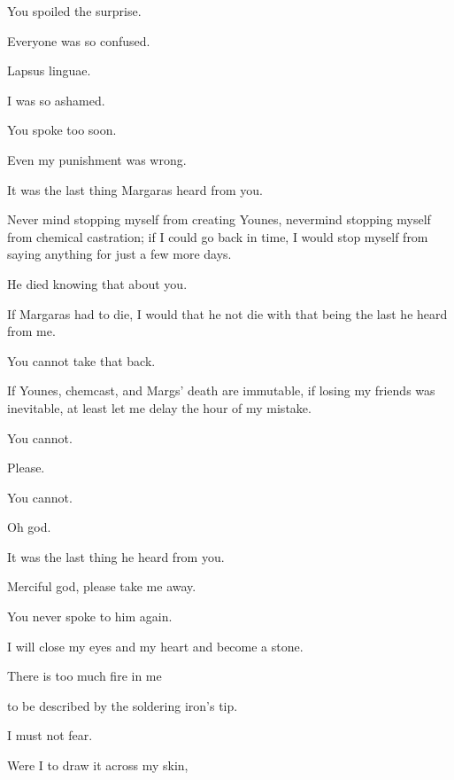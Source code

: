 \begin{paracol}{2}
\begin{leftcolumn}
\begin{ally}
You spoiled the surprise.
\end{ally}
Everyone was so confused.

\begin{ally}
Lapsus linguae.
\end{ally}
I was so ashamed.

\begin{ally}
You spoke too soon.
\end{ally}
Even my punishment was wrong.

\begin{ally}
It was the last thing Margaras heard from you.
\end{ally}
Never mind stopping myself from creating Younes, nevermind stopping myself from chemical castration; if I could go back in time, I would stop myself from saying anything for just a few more days.

\begin{ally}
He died knowing that about you.
\end{ally}
If Margaras had to die, I would that he not die with that being the last he heard from me.

\begin{ally}
You cannot take that back.
\end{ally}
If Younes, chemcast, and Margs' death are immutable, if losing my friends was inevitable, at least let me delay the hour of my mistake.

\begin{ally}
You cannot.
\end{ally}
Please.

\begin{ally}
You cannot.
\end{ally}
Oh god.

\begin{ally}
It was the last thing he heard from you.
\end{ally}
Merciful god, please take me away.

\begin{ally}
You never spoke to him again.
\end{ally}
I will close my eyes and my heart and become a stone.
\newpage
\null
\thispagestyle{empty}
\newpage

\noindent There is too much fire in me

to be described by the soldering iron's tip.

\begin{ally}
I must not fear.
\end{ally}
Were I to draw it across my skin,


\end{leftcolumn}
\end{paracol}
